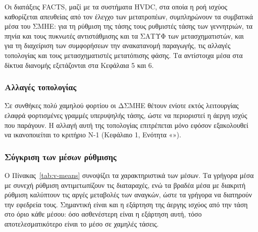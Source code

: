 Οι διατάξεις FACTS, μαζί με τα συστήματα HVDC, στα οποία η ροή ισχύος καθορίζεται απευθείας από τον έλεγχο των
μετατροπέων, συμπληρώνουν τα συμβατικά μέσα του ΣΜΗΕ: για τη ρύθμιση της τάσης
τους ρυθμιστές τάσης των γεννητριών, τα πηνία και τους πυκνωτές αντιστάθμισης και τα
ΣΑΤΥΦ των μετασχηματιστών, και για τη διαχείριση των συμφορήσεων την ανακατανομή
παραγωγής, τις αλλαγές τοπολογίας και τους μετασχηματιστές μετατόπισης φάσης. Τα αντίστοιχα μέσα στα
δίκτυα διανομής εξετάζονται στα Κεφάλαια 5 και 6.

\subsubsection{Αλλαγές τοπολογίας}

Σε συνθήκες πολύ χαμηλού φορτίου οι ΔΣΜΗΕ θέτουν ενίοτε εκτός λειτουργίας ελαφρά φορτισμένες
γραμμές υπερυψηλής τάσης, ώστε να περιοριστεί η άεργη ισχύς που παράγουν. Η αλλαγή αυτή της
τοπολογίας επιτρέπεται μόνο εφόσον εξακολουθεί να
ικανοποιείται το κριτήριο N-1 (Κεφάλαιο 1, Ενότητα «»).

\subsubsection{Σύγκριση των μέσων ρύθμισης}

Ο Πίνακας~\ref{tab:v-means} συνοψίζει τα χαρακτηριστικά των μέσων. Τα γρήγορα μέσα με συνεχή
ρύθμιση αντιμετωπίζουν τις διαταραχές, ενώ τα βραδέα μέσα με διακριτή ρύθμιση καλύπτουν τις
αργές μεταβολές των αναγκών, ώστε τα γρήγορα να διατηρούν την εφεδρεία τους. Σημαντική είναι και
η εξάρτηση της άεργης ισχύος από την τάση στο όριο κάθε μέσου: όσο ασθενέστερη είναι η
εξάρτηση αυτή, τόσο αποτελεσματικότερο είναι το μέσο σε χαμηλές τάσεις.

